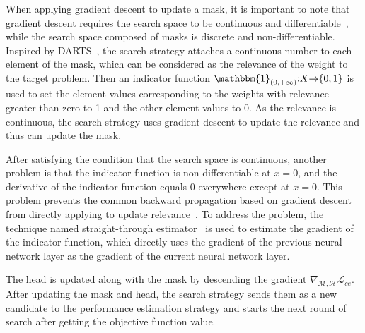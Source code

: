 When applying gradient descent to update a mask, it is important to note that gradient descent requires the search space to be continuous and differentiable~\cite{darts}, while the search space composed of masks is discrete and non-differentiable.
Inspired by DARTS~\cite{darts}, the search strategy attaches a continuous number to each element of the mask, which can be considered as the relevance of the weight to the target problem.
Then an indicator function $\mathbbm{1}_{(0, +\infty)}{:}X {\to} \{0,1\}$ is used to set the element values corresponding to the weights with relevance greater than zero to 1 and the other element values to 0.
As the relevance is continuous, the search strategy uses gradient descent to update the relevance and thus can update the mask.

After satisfying the condition that the search space is continuous, another problem is that the indicator function is non-differentiable at $x{=}0$, and the derivative of the indicator function equals 0 everywhere except at $x{=}0$.
This problem prevents the common backward propagation based on gradient descent from directly applying to update relevance~\cite{binaryNN,binarizedNN_2}.
To address the problem, the technique named straight-through estimator~\cite{ste,binarizedNN_2} is used to estimate the gradient of the indicator function, which directly uses the gradient of the previous neural network layer as the gradient of the current neural network layer.


The head is updated along with the mask by descending the gradient $\nabla_{\mathcal{M},\mathcal{H}}\mathcal{L}_{ce}$.
After updating the mask and head, the search strategy sends them as a new candidate to the performance estimation strategy and starts the next round of search after getting the objective function value.






